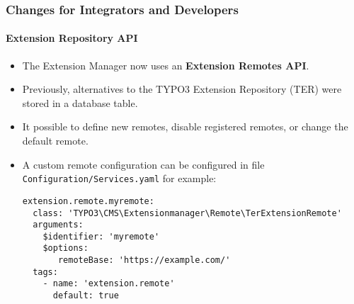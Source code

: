 %

\begin{frame}[fragile]
	\frametitle{Changes for Integrators and Developers}
	\framesubtitle{Extension Repository API}

	\lstset{basicstyle=\smaller\ttfamily}

	\begin{itemize}
		\item The Extension Manager now uses an \textbf{Extension Remotes API}.
		\item Previously, alternatives to the TYPO3 Extension Repository (TER)
			were stored in a database table.
		\item It possible to define new remotes, disable registered remotes,
			or change the default remote.
		\item A custom remote configuration can be configured in file
			\small\texttt{Configuration/Services.yaml} for example:
\begin{lstlisting}
extension.remote.myremote:
  class: 'TYPO3\CMS\Extensionmanager\Remote\TerExtensionRemote'
  arguments:
    $identifier: 'myremote'
    $options:
       remoteBase: 'https://example.com/'
  tags:
    - name: 'extension.remote'
      default: true
\end{lstlisting}

	\end{itemize}

\end{frame}

